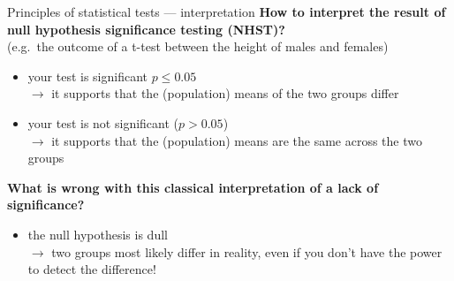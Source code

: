 \documentclass[
  ignorenonframetext,
  aspectratio=169,
  t]{beamer}
\providecommand{\tightlist}{%
  \setlength{\itemsep}{0pt}\setlength{\parskip}{0pt}}
\newcommand{\bluenorm}[1]{\textcolor{bluebeamer}{#1}}
\newcommand{\bluebold}[1]{\textcolor{bluebeamer}{\textbf{#1}}}
\begin{document}
\begin{frame}{Principles of statistical tests --- interpretation}
\protect{}\label{principles-of-statistical-tests-interpretation}
\bluebold{How to interpret the result of null hypothesis significance testing (NHST)?}\\
(e.g.~the outcome of a t-test between the height of males and females)

\begin{itemize}
\tightlist
\item
  your test is significant \(p\leq0.05\)\\
  \(\rightarrow\) it supports that the (population) means of the two
  groups differ
\end{itemize}

\pause

\begin{itemize}
\tightlist
\item
  your test is not significant (\(p>0.05\))\\
  \(\rightarrow\) it supports that the (population) means are the same
  across the two groups
\end{itemize}

\pause

\bluebold{What is wrong with this classical interpretation of a lack of significance?}

\begin{itemize}
\tightlist
\item
  the \bluenorm{null} hypothesis is \bluenorm{dull}\\
  \(\rightarrow\) two groups most likely differ in reality, even if you
  don't have the power to detect the difference!
\end{itemize}
\end{frame}
\end{document}
